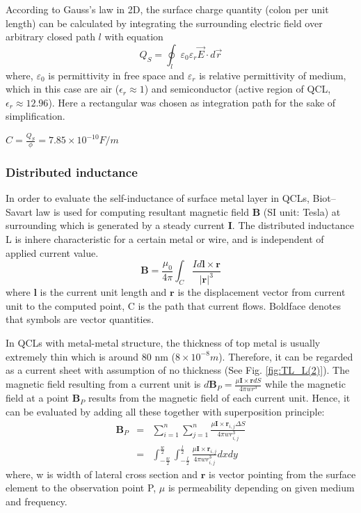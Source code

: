 \documentclass[11pt,final]{scrbook}
\begin{document}
According to Gauss's law in 2D, the surface charge quantity (colon per unit length) can be calculated by integrating the surrounding electric field over arbitrary closed path $l$ with equation
\begin{equation}
{ Q }_{ S }=\oint _{ l }{\varepsilon_{0}\varepsilon_{r}\overrightarrow { E } \cdot d\overrightarrow { r } }
 \end{equation}
 where, $\varepsilon_{0}$ is permittivity in free space and $\varepsilon_{r}$ is relative permittivity of medium, which in this case are air ($\epsilon_{r}\approx 1$) and semiconductor (active region of QCL, $\epsilon_{r}\approx 12.96$). Here a rectangular was chosen as integration path for the sake of simplification. 

 $C=\frac{Q_{S}}{\phi}=7.85\times 10^{-10} F/m$
\subsubsection{Distributed inductance}
In order to evaluate the self-inductance of surface metal layer in QCLs, Biot–Savart law \cite{grant2013electromagnetism} is used for computing resultant magnetic field $\textbf{B}$ (SI unit: Tesla) at surrounding which is generated by a steady current $\textbf{I}$. The distributed inductance L is inhere characteristic for a certain metal or wire, and is independent of applied current value.  
\begin{equation}
\textbf{B}=\frac{\mu_{0}}{4\pi}\int _{ C }{ \frac { Id\textbf{l}\times \textbf{r} }{ |\textbf{r}| ^{3}}}
\end{equation}
where $\textbf{l}$ is the current unit length and $\textbf{r}$ is the displacement vector from current unit to the computed point, C is the path that current flows. Boldface denotes that symbols are vector quantities.

In QCLs with metal-metal structure, the thickness of top metal is usually extremely thin which is around 80 nm ($8\times 10^{-8} m$). Therefore, it can be regarded as a current sheet with assumption of no thickness (See Fig. \ref{fig:TL_L(2)}). The magnetic field resulting from a current unit is $d\textbf{B}_{P}=\frac { \mu \textbf{I}\times { \textbf{r}}dS }{ 4\pi w{ r }^{ 3 }}$ while the magnetic field at a point $ \textbf{B}_{P}$ results from the magnetic field of each current unit. Hence, it can be evaluated by adding all these together with superposition principle:
\begin{eqnarray}
 \textbf{B}_{P}&=&\sum _{ i=1 }^{ n }{ \sum _{ j=1 }^{ n }{ \frac { \mu \textbf{I}\times { \textbf{r} }_{ i,j } \Delta S }{ 4\pi w{ r }_{ i,j }^{ 3 } }  }  } \\
 &=&\int _{ -\frac { w }{ 2 }  }^{ \frac { w }{ 2 }  }{ \int _{ -\frac { l }{ 2 }  }^{ \frac { l }{ 2 }  }{ { \frac { \mu { \textbf{I} }\times { { \textbf{r} } }_{ i,j } }{ 4\pi w{ r }_{ i,j }^{ 3 } }  } }  } dxdy \label{eq. TL_L}
 \end{eqnarray}
 where, w is width of lateral cross section and $\textbf{r}$ is vector pointing from the surface element to the observation point P, $\mu$ is permeability depending on given medium and frequency.
\end{document}
